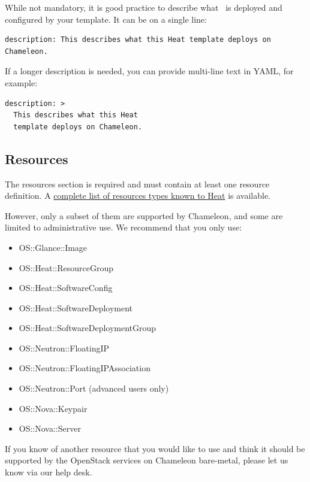 While not mandatory, it is good practice to describe what ~is deployed
and configured by your template. It can be on a single line:

\begin{footnotesize}
\begin{verbatim}
description: This describes what this Heat template deploys on Chameleon.
\end{verbatim}
\end{footnotesize}

If a longer description is needed, you can provide multi-line text in
YAML, for example:

\begin{footnotesize}
\begin{verbatim}
description: >
  This describes what this Heat
  template deploys on Chameleon.
\end{verbatim}
\end{footnotesize}

\subsection{Resources}\label{resources}

The resources section is required and must contain at least one resource
definition. A
\href{http://docs.openstack.org/developer/heat/template_guide/openstack.html}{complete
list of resources types known to Heat} is available.

However, only a subset of them are supported by Chameleon, and some are
limited to administrative use. We recommend that you only use:

\begin{itemize}
\item
  OS::Glance::Image
\item
  OS::Heat::ResourceGroup
\item
  OS::Heat::SoftwareConfig
\item
  OS::Heat::SoftwareDeployment
\item
  OS::Heat::SoftwareDeploymentGroup
\item
  OS::Neutron::FloatingIP
\item
  OS::Neutron::FloatingIPAssociation
\item
  OS::Neutron::Port (advanced users only)
\item
  OS::Nova::Keypair
\item
  OS::Nova::Server
\end{itemize}

If you know of another resource that you would like to use and think it
should be supported by the OpenStack services on Chameleon bare-metal,
please let us know via our help desk.

